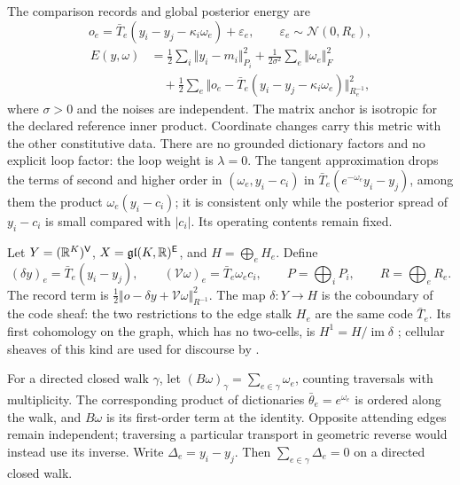 \documentclass[11pt,letterpaper]{report}
\begin{document}
The comparison records and global posterior energy are
\begin{equation}
o_e=\bar T_e(y_i-y_j-\kappa_i\omega_e)+\varepsilon_e,
\qquad\varepsilon_e\sim\mathcal N(0,R_e),
\end{equation}
\begin{equation}
\begin{aligned}
E(y,\omega)&=\frac12\sum_i\Vert y_i-m_i\Vert_{P_i}^2
+\frac1{2\sigma^2}\sum_e\Vert\omega_e\Vert_F^2\\
&\quad+\frac12\sum_e\Vert o_e-\bar T_e(y_i-y_j-\kappa_i\omega_e)\Vert_{R_e^{-1}}^2,
\end{aligned}
\label{it3:energy}
\end{equation}
where $\sigma>0$ and the noises are independent. The matrix anchor is isotropic for the declared reference inner product. Coordinate changes carry this metric with the other constitutive data. There are no grounded dictionary factors and no explicit loop factor: the loop weight is $\lambda=0$. The tangent approximation drops the terms of second and higher order in $(\omega_e,y_i-c_i)$ in $\bar T_e(e^{-\omega_e}y_i-y_j)$, among them the product $\omega_e(y_i-c_i)$; it is consistent only while the posterior spread of $y_i-c_i$ is small compared with $|c_i|$. Its operating contents remain fixed.

Let $Y=(\mathbb R^K)^{\mathsf V}$, $X=\mathfrak{gl}(K,\mathbb R)^{\mathsf E}$, and $H=\bigoplus_e H_e$. Define
\begin{equation}
(\delta y)_e=\bar T_e(y_i-y_j),\qquad
(\mathcal V\omega)_e=\bar T_e\omega_ec_i,\qquad
P=\bigoplus_iP_i,\qquad R=\bigoplus_eR_e.
\end{equation}
The record term is $\frac12\Vert o-\delta y+\mathcal V\omega\Vert_{R^{-1}}^2$. The map $\delta:Y\to H$ is the coboundary of the code sheaf: the two restrictions to the edge stalk $H_e$ are the same code $\bar T_e$. Its first cohomology on the graph, which has no two-cells, is $H^1=H/\operatorname{im}\delta$ \citep[Section~2.2]{HansenGhrist2019}; cellular sheaves of this kind are used for discourse by \citet{HansenGhrist2021}.

For a directed closed walk $\gamma$, let $(B\omega)_\gamma=\sum_{e\in\gamma}\omega_e$, counting traversals with multiplicity. The corresponding product of dictionaries $\bar\theta_e=e^{\omega_e}$ is ordered along the walk, and $B\omega$ is its first-order term at the identity. Opposite attending edges remain independent; traversing a particular transport in geometric reverse would instead use its inverse. Write $\Delta_e=y_i-y_j$. Then $\sum_{e\in\gamma}\Delta_e=0$ on a directed closed walk.
\end{document}

